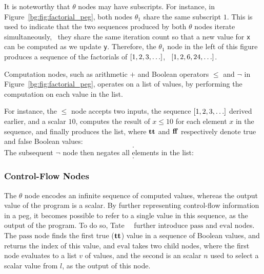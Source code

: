 It is noteworthy that $\theta$ nodes may have subscripts.  For instance,
in Figure~\ref{bg:fig:factorial_peg}, both nodes $\theta_1$ share the same
subscript $1$.  This is used to indicate that the two sequences produced
by both $\theta$ nodes iterate simultaneously, \ie~they share the same
iteration count so that a new value for \verb|x| can be computed as we update
\verb|y|.  Therefore, the $\theta_1$ node in the left of this figure produces
a sequence of the factorials of $[1, 2, 3, \mathellipsis]$, \ie~$[1, 2, 6, 24,
\mathellipsis]$.

Computation nodes, such as arithmetic $+$ and Boolean operators $\leq$ and
$\neg$ in Figure~\ref{bg:fig:factorial_peg}, operates on a list of values, by
performing the computation on each value in the list.

For instance, the $\leq$ node accepts two inputs, the sequence $[1, 2, 3,
\mathellipsis]$ derived earlier, and a scalar $10$, computes the result of $x
\leq 10$ for each element $x$ in the sequence, and finally produces the list,
where $\mathbf{tt}$ and $\mathbf{ff}$ respectively denote true and false Boolean
values:
\begin{equation}
    [
        \truelit, \truelit, \truelit, \truelit, \truelit,
        \truelit, \truelit, \truelit, \truelit, \truelit,
        \falselit, \falselit, \falselit, \mathellipsis
    ].
\end{equation}
The subsequent $\neg$ node then negates all elements in the list:
\begin{equation}
    [
        \falselit, \falselit, \falselit, \falselit, \falselit,
        \falselit, \falselit, \falselit, \falselit, \falselit,
        \truelit, \truelit, \truelit, \mathellipsis
    ].
    \label{bg:eq:bool_seq}
\end{equation}

\subsubsection{Control-Flow Nodes}

The $\theta$ node encodes an infinite sequence of computed values, whereas
the output value of the program is a scalar.  By further representing
control-flow information in a \gls{peg}, it becomes possible to refer to a
single value in this sequence, as the output of the program.  To do so,
Tate~\etal~\cite{tate09} further introduce $\mathrm{pass}$ and $\mathrm{eval}$
nodes.  The $\mathrm{pass}$ node finds the first true ($\mathbf{tt}$) value
in a sequence of Boolean values, and returns the index of this value, and
$\mathrm{eval}$ takes two child nodes, where the first node evaluates to a list
$v$ of values, and the second is an scalar $n$ used to select a scalar value
from $l$, as the output of this node.

